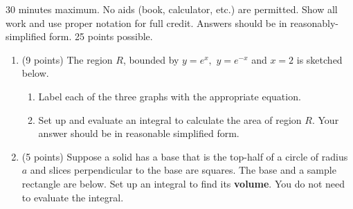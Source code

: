 \documentclass[12pt]{article}
\begin{document}
30 minutes maximum.  No aids (book, calculator, etc.) are permitted.  Show all work and use proper notation for full credit.  Answers should be in reasonably-simplified form.  25 points possible.

\begin{enumerate}
\item (9 points) The region $R$, bounded by $y=e^x,$  $y=e^{-x}$ and $x=2$ is sketched below. \\
	\begin{enumerate}
	\item Label each of the three graphs with the appropriate equation.\\
	
	\item Set up and evaluate an integral to calculate the area of region $R.$ Your answer should be in reasonable simplified form.\\	
	\vfill
	
	\end{enumerate}
\item (5 points)  Suppose a solid has a base that is the top-half of a circle of radius $a$ and slices perpendicular to the base are squares. The base and a sample rectangle are below. Set up an integral to find its \textbf{volume}. You do not need to evaluate the integral.

\end{enumerate}
\end{document}

